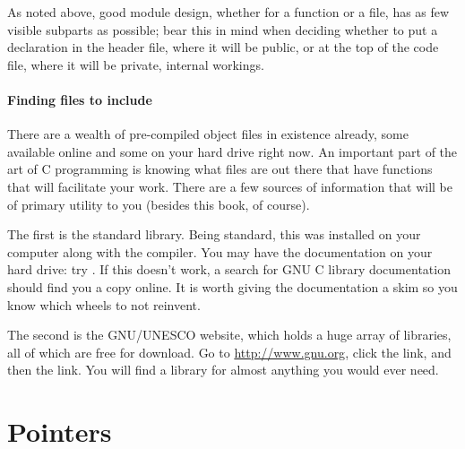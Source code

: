 \documentclass[12pt]{article}
\begin{document}
As noted above, good module design, whether for a function or a file, has as few
visible subparts as possible; bear this in mind when deciding whether to put a
declaration in the header file, where it will be public, or at the top of the code file,
where it will be private, internal workings.
\paragraph{\treesymbol{} Finding files to include}    
There are a wealth of pre-compiled object files in existence already,
some available online and some on your hard drive right now.  An
important part of the art of C programming is knowing what files are
out there that have functions that will facilitate your work. There
are a few sources of information that will be of primary utility to you
(besides this book, of course).

The first is the standard library. Being standard, this was
installed on your computer along with the compiler. You may have the
documentation on your hard drive: try . If this doesn't
work, a search for GNU C library documentation should find you a copy
online. It is worth giving the documentation a skim so you know which
wheels to not reinvent.

The second is the GNU/UNESCO website, which holds a huge
array of libraries, all of which are free for download. Go to
\url{http://www.gnu.org}, click the  link, and then
the  link. You will find a library for almost
anything you would ever need.


 \label{prepointers}\section{Pointers} \label{pointers} 
\end{document}
